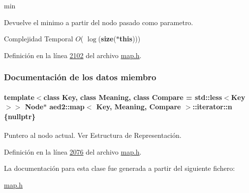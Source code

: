 min 

Devuelve el minimo a partir del nodo pasado como parametro.


\begin{DoxyDescription}
\item[Complejidad Temporal]$O$( $\log$({\bfseries size}({\bfseries $\ast$this})))
\end{DoxyDescription}

Definición en la línea \hyperlink{map_8h_source_l02102}{2102} del archivo \hyperlink{map_8h_source}{map.\+h}.



\subsubsection{Documentación de los datos miembro}
\paragraph[{\texorpdfstring{n}{n}}]{\setlength{\rightskip}{0pt plus 5cm}template$<$class Key, class Meaning, class Compare = std\+::less$<$\+Key$>$$>$ Node$\ast$ {\bf aed2\+::map}$<$ Key, Meaning, Compare $>$\+::iterator\+::n \{nullptr\}\hspace{0.3cm}{\ttfamily [private]}}\hypertarget{classaed2_1_1map_1_1iterator_adf8633ef71bb6c1fc01c0abe8728fd93_adf8633ef71bb6c1fc01c0abe8728fd93}{}\label{classaed2_1_1map_1_1iterator_adf8633ef71bb6c1fc01c0abe8728fd93_adf8633ef71bb6c1fc01c0abe8728fd93}


Puntero al nodo actual. Ver Estructura de Representación. 



Definición en la línea \hyperlink{map_8h_source_l02076}{2076} del archivo \hyperlink{map_8h_source}{map.\+h}.



La documentación para esta clase fue generada a partir del siguiente fichero\+:\begin{DoxyCompactItemize}
\item 
\hyperlink{map_8h}{map.\+h}\end{DoxyCompactItemize}
